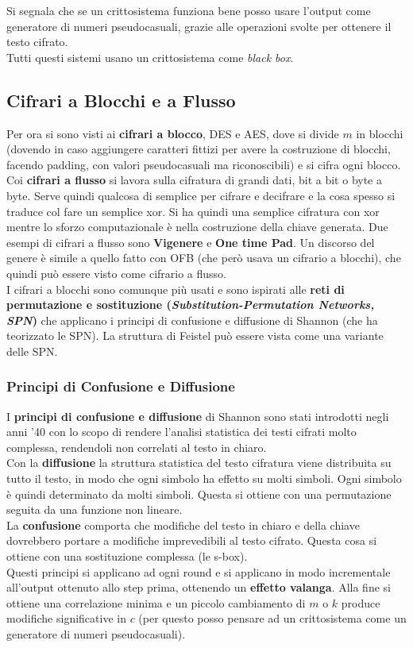 \documentclass[a4paper,12pt, oneside]{book}
\begin{document}
Si segnala che se un crittosistema funziona bene posso usare l'output come
generatore di numeri pseudocasuali, grazie alle operazioni svolte per ottenere
il testo cifrato.\\
Tutti questi sistemi usano un crittosistema come \textit{black box}.\\
\subsection{Cifrari a Blocchi e a Flusso}
Per ora si sono visti ai \textbf{cifrari a blocco}, DES e AES, dove si divide
$m$ in blocchi (dovendo in caso aggiungere caratteri fittizi per avere la
costruzione di blocchi, facendo padding,
con valori pseudocasuali ma riconoscibili) e si cifra ogni blocco.\\
Coi \textbf{cifrari a flusso} si lavora sulla cifratura di grandi dati, bit a
bit o byte a byte. Serve quindi qualcosa di semplice per cifrare e decifrare e
la cosa spesso si traduce col fare un semplice xor. Si ha quindi una semplice
cifratura con xor mentre lo sforzo computazionale è nella costruzione della
chiave generata. Due esempi di cifrari a flusso sono \textbf{Vigenere} e
\textbf{One time Pad}. Un discorso del genere è simile a quello fatto con OFB
(che però usava un cifrario a blocchi), che quindi può essere visto come
cifrario a flusso.\\
I cifrari a blocchi sono comunque più usati e sono ispirati alle \textbf{reti di
permutazione e sostituzione (\textit{Substitution-Permutation Networks, SPN})}
che applicano i principi di confusione e diffusione di Shannon (che ha
teorizzato le SPN). La struttura di Feistel può essere vista come una
variante delle SPN.
\subsubsection{Principi di Confusione e Diffusione}
I \textbf{principi di confusione e diffusione} di Shannon sono stati introdotti
negli anni '40 con lo scopo di rendere l'analisi statistica dei testi cifrati
molto complessa, rendendoli non correlati al testo in chiaro. \\
Con la \textbf{diffusione} la struttura statistica del testo cifratura viene
distribuita 
su tutto il testo, in modo che ogni simbolo ha effetto su molti simboli. Ogni
simbolo è quindi determinato da molti simboli. Questa si ottiene con una
permutazione seguita da una funzione non lineare.\\
La \textbf{confusione} comporta che modifiche del testo in chiaro e della chiave
dovrebbero portare a modifiche imprevedibili al testo cifrato. Questa cosa si
ottiene con una sostituzione complessa (le s-box). \\
Questi principi si applicano ad ogni round e si applicano in modo incrementale
all'output ottenuto allo step prima, ottenendo un \textbf{effetto valanga}. Alla
fine si ottiene una correlazione minima e un piccolo cambiamento di $m$ o $k$
produce modifiche significative in $c$ (per questo posso pensare ad un
crittosistema come un generatore di numeri pseudocasuali). \\
\end{document}
